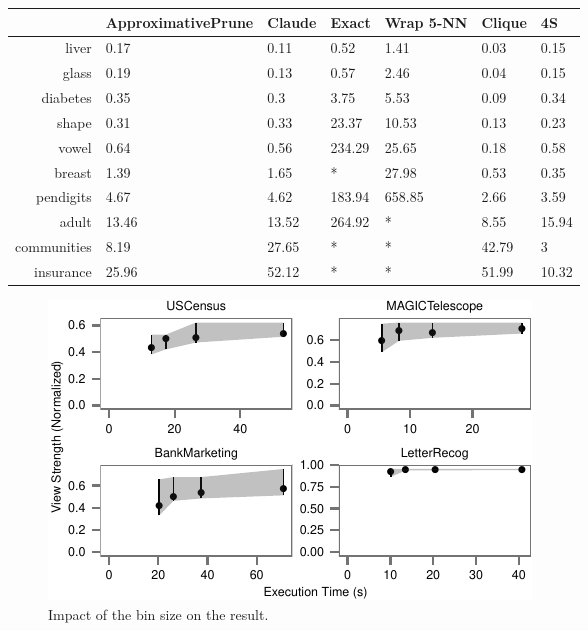 \begin{table}[ht]
\centering
\begin{tabular}{rllllll}
  \hline
 & ApproximativePrune & Claude & Exact & Wrap 5-NN & Clique & 4S \\ 
  \hline
liver & 0.17 & 0.11 & 0.52 & \cellcolor{red} 1.41 & \cellcolor{grn} 0.03 & 0.15 \\ 
  glass & 0.19 & 0.13 & 0.57 & \cellcolor{red} 2.46 & \cellcolor{grn} 0.04 & 0.15 \\ 
  diabetes & 0.35 & 0.3 & 3.75 & \cellcolor{red} 5.53 & \cellcolor{grn} 0.09 & 0.34 \\ 
  shape & 0.31 & 0.33 & \cellcolor{red} 23.37 & 10.53 & \cellcolor{grn} 0.13 & 0.23 \\ 
  vowel & 0.64 & 0.56 & \cellcolor{red} 234.29 & 25.65 & \cellcolor{grn} 0.18 & 0.58 \\ 
  breast & 1.39 & 1.65 & * & \cellcolor{red} 27.98 & 0.53 & \cellcolor{grn} 0.35 \\ 
  pendigits & 4.67 & 4.62 & 183.94 & \cellcolor{red} 658.85 & \cellcolor{grn} 2.66 & 3.59 \\ 
  adult & 13.46 & 13.52 & \cellcolor{red} 264.92 & * & \cellcolor{grn} 8.55 & 15.94 \\ 
  communities & 8.19 & 27.65 & * & * & \cellcolor{red} 42.79 & \cellcolor{grn} 3 \\ 
  insurance & 25.96 & \cellcolor{red} 52.12 & * & * & 51.99 & \cellcolor{grn} 10.32 \\ 
   \hline
\end{tabular}
\end{table}

\begin{figure}[t!]
\centering
\includegraphics[width=2\columnwidth]{plots/view-vary-beam}
\caption{Impact of the bin size on the result.}
\label{pic:bin-size}
\end{figure}


